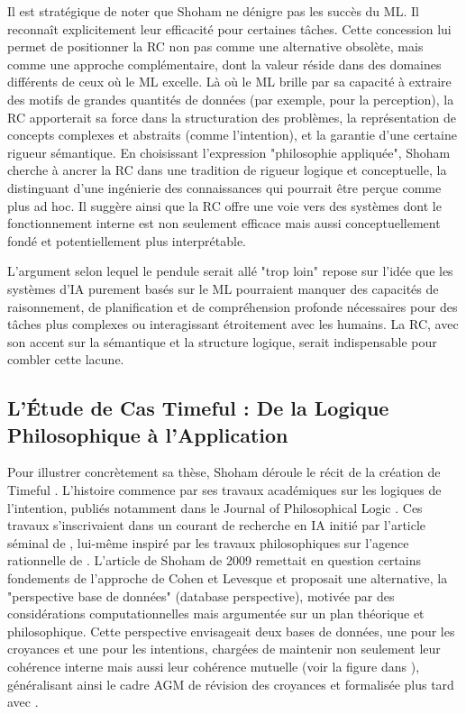 \documentclass[11pt,a4paper]{article}
\begin{document}
Il est stratégique de noter que Shoham ne dénigre pas les succès du ML. Il reconnaît explicitement leur efficacité pour certaines tâches. Cette concession lui permet de positionner la RC non pas comme une alternative obsolète, mais comme une approche complémentaire, dont la valeur réside dans des domaines différents de ceux où le ML excelle. Là où le ML brille par sa capacité à extraire des motifs de grandes quantités de données (par exemple, pour la perception), la RC apporterait sa force dans la structuration des problèmes, la représentation de concepts complexes et abstraits (comme l'intention), et la garantie d'une certaine rigueur sémantique. En choisissant l'expression "philosophie appliquée", Shoham cherche à ancrer la RC dans une tradition de rigueur logique et conceptuelle, la distinguant d'une ingénierie des connaissances qui pourrait être perçue comme plus ad hoc. Il suggère ainsi que la RC offre une voie vers des systèmes dont le fonctionnement interne est non seulement efficace mais aussi conceptuellement fondé et potentiellement plus interprétable.

L'argument selon lequel le pendule serait allé "trop loin" \citep{Shoham2015Why} repose sur l'idée que les systèmes d'IA purement basés sur le ML pourraient manquer des capacités de raisonnement, de planification et de compréhension profonde nécessaires pour des tâches plus complexes ou interagissant étroitement avec les humains. La RC, avec son accent sur la sémantique et la structure logique, serait indispensable pour combler cette lacune.

\subsection{L'Étude de Cas Timeful : De la Logique Philosophique à l'Application}

Pour illustrer concrètement sa thèse, Shoham déroule le récit de la création de Timeful \citep{Shoham2015Why}. L'histoire commence par ses travaux académiques sur les logiques de l'intention, publiés notamment dans le Journal of Philosophical Logic \citep{Shoham2009Logics}. Ces travaux s'inscrivaient dans un courant de recherche en IA initié par l'article séminal de \citet{Cohen1990Intention}, lui-même inspiré par les travaux philosophiques sur l'agence rationnelle de \citet{Bratman1991Intentions}. L'article de Shoham de 2009 remettait en question certains fondements de l'approche de Cohen et Levesque et proposait une alternative, la "perspective base de données" (database perspective), motivée par des considérations computationnelles mais argumentée sur un plan théorique et philosophique. Cette perspective envisageait deux bases de données, une pour les croyances et une pour les intentions, chargées de maintenir non seulement leur cohérence interne mais aussi leur cohérence mutuelle (voir la figure dans \citep{Shoham2015Why}), généralisant ainsi le cadre AGM de révision des croyances \citep{AlchourronGardenforsMakinson1985} et formalisée plus tard avec \citet{Icard2023Joint}.
\end{document}
